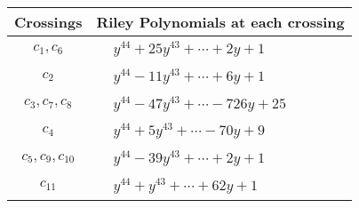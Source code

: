 \documentclass[1p]{elsarticle_modified}
\theoremstyle{definition}
\begin{document}
\begin{tabular}{m{50pt}|m{274pt}}
Crossings & \hspace{64pt}Riley Polynomials at each crossing \\
\hline $$\begin{aligned}c_{1},c_{6}\end{aligned}$$&$\begin{aligned}
&y^{44}+25 y^{43}+\cdots+2 y+1
\end{aligned}$\\
\hline $$\begin{aligned}c_{2}\end{aligned}$$&$\begin{aligned}
&y^{44}-11 y^{43}+\cdots+6 y+1
\end{aligned}$\\
\hline $$\begin{aligned}c_{3},c_{7},c_{8}\end{aligned}$$&$\begin{aligned}
&y^{44}-47 y^{43}+\cdots-726 y+25
\end{aligned}$\\
\hline $$\begin{aligned}c_{4}\end{aligned}$$&$\begin{aligned}
&y^{44}+5 y^{43}+\cdots-70 y+9
\end{aligned}$\\
\hline $$\begin{aligned}c_{5},c_{9},c_{10}\end{aligned}$$&$\begin{aligned}
&y^{44}-39 y^{43}+\cdots+2 y+1
\end{aligned}$\\
\hline $$\begin{aligned}c_{11}\end{aligned}$$&$\begin{aligned}
&y^{44}+y^{43}+\cdots+62 y+1
\end{aligned}$\\
\hline
\end{tabular}
\vskip 2pc
\end{document}
